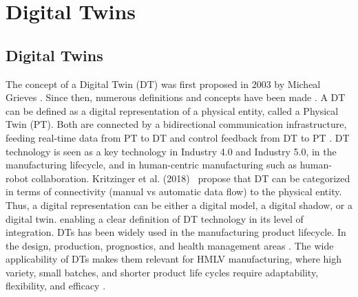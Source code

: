 \section{Digital Twins}\label{sec:digital-twins}

\subsection{Digital Twins}
The concept of a Digital Twin (DT) was first proposed in 2003 by Micheal Grieves \cite{TAO2019653}. Since then, numerous definitions and concepts have been made \cite{LIU2021346}. A DT can be defined as a digital representation of a physical entity, called a Physical Twin (PT). Both are connected by a bidirectional communication infrastructure, feeding real-time data from PT to DT and control feedback from DT to PT \cite{Larsen2024}. DT technology is seen as a key technology in Industry 4.0 and Industry 5.0, in the manufacturing lifecycle, and in human-centric manufacturing such as human-robot collaboration. Kritzinger et al. (2018)~\cite{KRITZINGER20181016} propose that DT can be categorized in terms of connectivity (manual vs automatic data flow) to the physical entity. Thus, a digital representation can be either a digital model, a digital shadow, or a digital twin. enabling a clear definition of DT technology in its level of integration. DTs has been widely used in the manufacturing product lifecycle. In the design, production, prognostics, and health management areas \cite{DT8477101}. The wide applicability of DTs makes them relevant for HMLV manufacturing, where high variety, small batches, and shorter product life cycles require adaptability, flexibility, and efficacy \cite{app13031687}.



